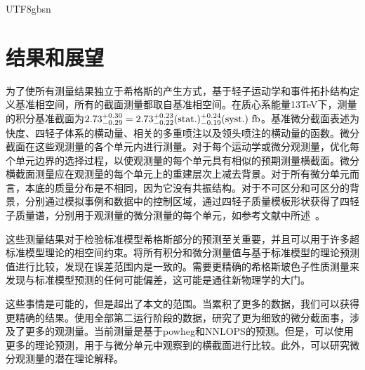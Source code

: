 \begin{CJK}{UTF8}{gbsn}
	\section{结果和展望} \label{results_chinese}
	为了使所有测量结果独立于希格斯的产生方式，基于轻子运动学和事件拓扑结构定义基准相空间，所有的截面测量都取自基准相空间。在质心系能量13TeV下，测量的积分基准截面为$2.73^{+0.30}_{-0.29}=2.73^{+0.23}_{-0.22}({\rm stat.})^{+0.24}_{-0.19}({\rm syst.})~{\rm fb}$。基准微分截面表述为快度、四轻子体系的横动量、相关的多重喷注以及领头喷注的横动量的函数。微分截面在这些观测量的各个单元内进行测量。对于每个运动学或微分观测量，优化每个单元边界的选择过程，以使观测量的每个单元具有相似的预期测量横截面。微分横截面测量应在观测量的每个单元上的重建层次上减去背景。对于所有微分单元而言，本底的质量分布是不相同，因为它没有共振结构。对于不可区分和可区分的背景，分别通过模拟事例和数据中的控制区域，通过四轻子质量模板形状获得了四轻子质量谱，分别用于观测量的微分测量的每个单元，如参考文献中所述~\cite{Chatrchyan:2013mxa}。
	\par 这些测量结果对于检验标准模型希格斯部分的预测至关重要，并且可以用于许多超标准模型理论的相空间约束。将所有积分和微分测量值与基于标准模型的理论预测值进行比较，发现在误差范围内是一致的。需要更精确的希格斯玻色子性质测量来发现与标准模型预测的任何可能偏差，这可能是通往新物理学的大门。
	\par 这些事情是可能的，但是超出了本文的范围。当累积了更多的数据，我们可以获得更精确的结果。使用全部第二运行阶段的数据，研究了更为细致的微分截面事，涉及了更多的观测量。当前测量是基于{\sc powheg}和{\sc NNLOPS}的预测。但是，可以使用更多的理论预测，用于与微分单元中观察到的横截面进行比较。此外，可以研究微分观测量的潜在理论解释。

\end{CJK}
